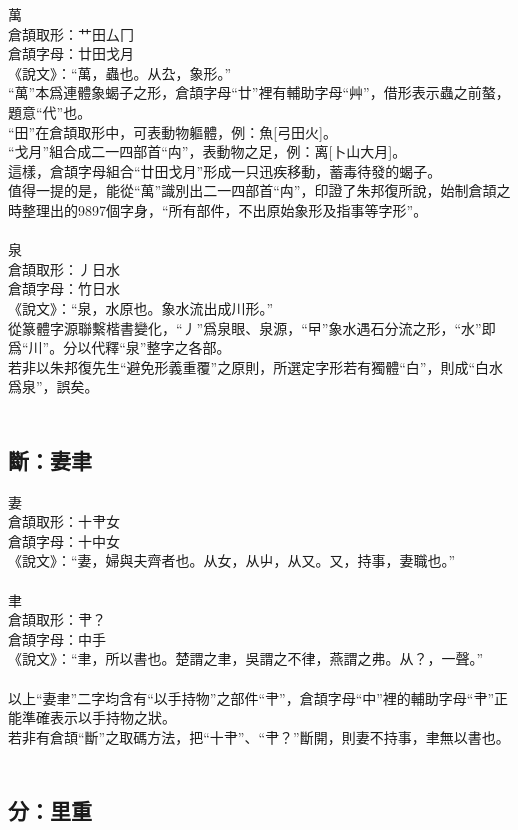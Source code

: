 \documentclass{article}
\begin{document}
萬\\
倉頡取形：艹田厶冂\\
倉頡字母：廿田戈月\\
《說文》：“萬，蟲也。从厹，象形。”\\
“萬”本爲連體象蝎子之形，倉頡字母“廿”裡有輔助字母“艸”，借形表示蟲之前螯，題意“代”也。\\
“田”在倉頡取形中，可表動物軀體，例：魚[弓田火]。\\
“戈月”組合成二一四部首“禸”，表動物之足，例：离[卜山大月]。\\
這樣，倉頡字母組合“廿田戈月”形成一只迅疾移動，蓄毒待發的蝎子。\\
值得一提的是，能從“萬”識別出二一四部首“禸”，印證了朱邦復所說，始制倉頡之時整理出的9897個字身，“所有部件，不出原始象形及指事等字形”。\\
\\
泉\\
倉頡取形：丿日水\\
倉頡字母：竹日水\\
《說文》：“泉，水原也。象水流出成川形。”\\
從篆體字源聯繫楷書變化，“丿”爲泉眼、泉源，“曱”象水遇石分流之形，“水”即爲“川”。分以代釋“泉”整字之各部。\\
若非以朱邦復先生“避免形義重覆”之原則，所選定字形若有獨體“白”，則成“白水爲泉”，誤矣。\\
\\
\subsection{斷：妻聿}

妻\\
倉頡取形：十肀女\\
倉頡字母：十中女\\
《說文》：“妻，婦與夫齊者也。从女，从屮，从又。又，持事，妻職也。”\\
\\
聿\\
倉頡取形：肀？\\
倉頡字母：中手\\
《說文》：“聿，所以書也。楚謂之聿，吳謂之不律，燕謂之弗。从？，一聲。”\\
\\
以上“妻聿”二字均含有“以手持物”之部件“肀”，倉頡字母“中”裡的輔助字母“肀”正能準確表示以手持物之狀。\\
若非有倉頡“斷”之取碼方法，把“十肀”、“肀？”斷開，則妻不持事，聿無以書也。\\
\\
\subsection{分：里重}
\end{document}
